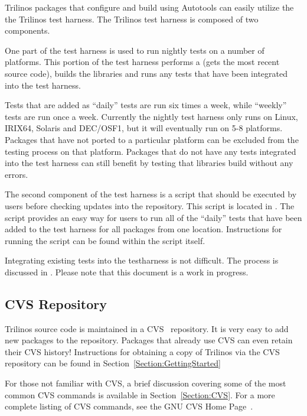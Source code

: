 \documentclass[12pt,relax]{TrilinosDevGuide}
\begin{document}
Trilinos packages that configure and build using Autotools can easily 
utilize the the Trilinos test harness.  The Trilinos test harness is composed 
of two components.  

One part of the test harness is used to run nightly tests on a number of 
platforms.  This portion of the test harness performs a 
 (gets the most recent source code), builds the 
libraries and runs any tests that have been integrated into 
the test harness.  

Tests that are added as ``daily'' tests are run six times a week, while 
``weekly'' tests are run once a week.  Currently the nightly test harness only 
runs on Linux, IRIX64, Solaris and DEC/OSF1, but it will eventually run on 5-8 
platforms.  Packages that have not ported to a particular platform can be 
excluded from the testing process on that platform.  Packages that do not have 
any tests integrated into the test harness can still benefit by testing that 
libraries build without any errors.  

The second component of the test harness is a script that should be executed 
by users before checking updates into the repository.  This script is located 
in .  The script 
provides an easy way for users to run all of the ``daily'' tests that have 
been added to the test harness for all packages from one location.  
Instructions for running the script can be found within the script itself.

Integrating existing tests into the testharness is not difficult.  
The process is discussed in 
.  
Please note that this document is a work in progress.

\subsection{CVS Repository}

Trilinos source code is maintained in a CVS~\cite{CVS} repository.  It is 
very easy to add new packages to the repository.  Packages that already use 
CVS can even retain their CVS history!  Instructions for obtaining a copy of 
Trilinos via the CVS repository can be found in 
Section~\ref{Section:GettingStarted}

For those not familiar with CVS, a brief discussion covering some of the most 
common CVS commands is available in Section~\ref{Section:CVS}.  
For a more complete listing of CVS commands, see the GNU 
CVS Home Page~\cite{CVS}.
\end{document}
